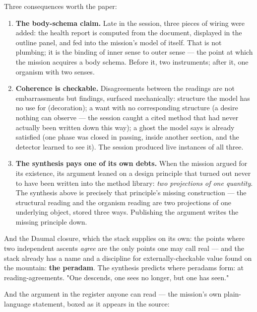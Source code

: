 \documentclass[11pt,oneside]{article}
\begin{document}
Three consequences worth the paper:

\begin{enumerate}[leftmargin=1.3em,itemsep=1pt]
\item \textbf{The body-schema claim.} Late in the session, three pieces of wiring were added: the health report is computed from the document, displayed in the outline panel, and fed into the mission's model of itself. That is not plumbing; it is the binding of inner sense to outer sense --- the point at which the mission acquires a body schema. Before it, two instruments; after it, one organism with two senses.
\item \textbf{Coherence is checkable.} Disagreements between the readings are not embarrassments but findings, surfaced mechanically: structure the model has no use for (decoration); a want with no corresponding structure (a desire nothing can observe --- the session caught a cited method that had never actually been written down this way); a ghost the model says is already satisfied (one phase was closed in passing, inside another section, and the detector learned to see it). The session produced live instances of all three.
\item \textbf{The synthesis pays one of its own debts.} When the mission argued for its existence, its argument leaned on a design principle that turned out never to have been written into the method library: \emph{two projections of one quantity}. The synthesis above is precisely that principle's missing construction --- the structural reading and the organism reading are two projections of one underlying object, stored three ways. Publishing the argument writes the missing principle down.
\end{enumerate}

And the Daumal closure, which the stack supplies on its own: the points where
two independent ascents \emph{agree} are the only points one may call real --- and
the stack already has a name and a discipline for externally-checkable value
found on the mountain: \textbf{the peradam}. The synthesis predicts where peradams
form: at reading-agreements. "One descends, one sees no longer, but one has
seen."

And the argument in the register anyone can read --- the mission's own
plain-language statement, boxed as it appears in the source:
\end{document}
